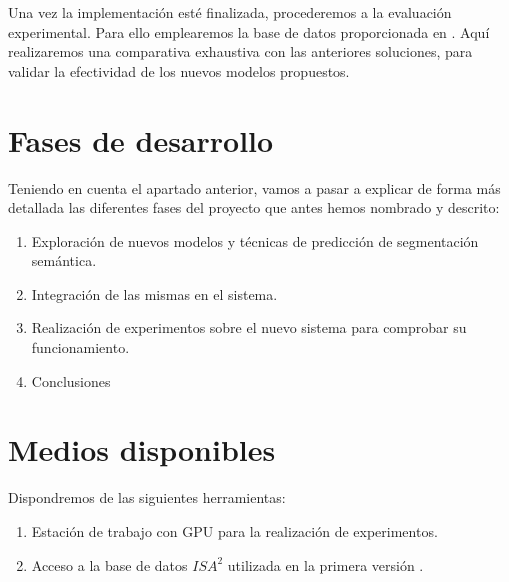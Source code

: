 \documentclass[12pt,oneside,a4paper]{article}
\begin{document}
Una vez la implementación esté finalizada, procederemos a la evaluación experimental. Para ello emplearemos la base de datos proporcionada en \cite{isa2}. Aquí realizaremos una comparativa exhaustiva con las anteriores soluciones, para validar la efectividad de los nuevos modelos propuestos.


\section{Fases de desarrollo}

Teniendo en cuenta el apartado anterior, vamos a pasar a explicar de forma más detallada las diferentes fases del proyecto que antes hemos nombrado y descrito:

\begin{enumerate}
 \item Exploración de nuevos modelos y técnicas de predicción de segmentación semántica.
 \item Integración de las mismas en el sistema.
 \item Realización de experimentos sobre el nuevo sistema para comprobar su funcionamiento.
 \item Conclusiones
\end{enumerate}

\section{Medios disponibles}

Dispondremos de las siguientes herramientas:

\begin{enumerate}
	\item Estación de trabajo con GPU para la realización de experimentos.
	\item Acceso a la base de datos $ISA^2$ utilizada en la primera versión \cite{isa2}.
\end{enumerate}

 








\end{document}
